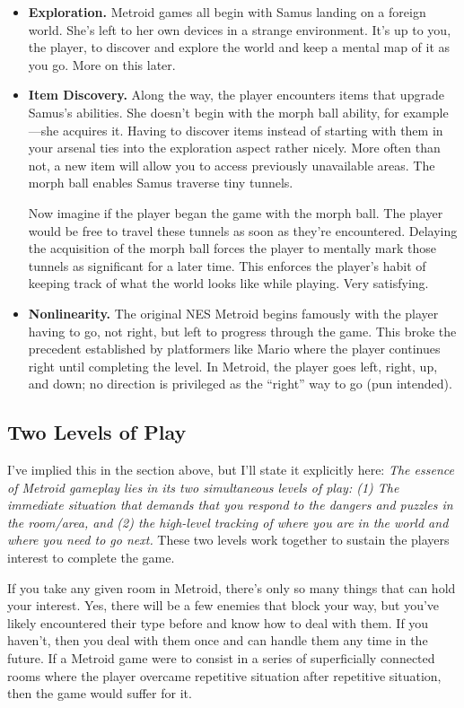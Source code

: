 \documentclass{article}
\begin{document}
\begin{itemize}
  \item{\textbf{Exploration.} Metroid games all begin with Samus landing on a foreign world. She's left to her own devices in a strange environment. It's up to you, the player, to discover and explore the world and keep a mental map of it as you go. More on this later.}
  \item{\textbf{Item Discovery.} Along the way, the player encounters items that upgrade Samus's abilities. She doesn't begin with the morph ball ability, for example---she acquires it. Having to discover items instead of starting with them in your arsenal ties into the exploration aspect rather nicely. More often than not, a new item will allow you to access previously unavailable areas. The morph ball enables Samus traverse tiny tunnels.

    Now imagine if the player began the game with the morph ball. The player would be free to travel these tunnels as soon as they're encountered. Delaying the acquisition of the morph ball forces the player to mentally mark those tunnels as significant for a later time. This enforces the player's habit of keeping track of what the world looks like while playing. Very satisfying.}
  \item{\textbf{Nonlinearity.} The original NES Metroid begins famously with the player having to go, not right, but left to progress through the game. This broke the precedent established by platformers like Mario where the player continues right until completing the level. In Metroid, the player goes left, right, up, and down; no direction is privileged as the ``right'' way to go (pun intended).}
\end{itemize}

\subsection*{Two Levels of Play}
I've implied this in the section above, but I'll state it explicitly here: \emph{The essence of Metroid gameplay lies in its two simultaneous levels of play: (1) The immediate situation that demands that you respond to the dangers  and puzzles in the room/area, and (2) the high-level tracking of where you are in the world and where you need to go next.} These two levels work together to sustain the players interest to complete the game.

If you take any given room in Metroid, there's only so many things that can hold your interest. Yes, there will be a few enemies that block your way, but you've likely encountered their type before and know how to deal with them. If you haven't, then you deal with them once and can handle them any time in the future. If a Metroid game were to consist in a series of superficially connected rooms where the player overcame repetitive situation after repetitive situation, then the game would suffer for it.
\end{document}
